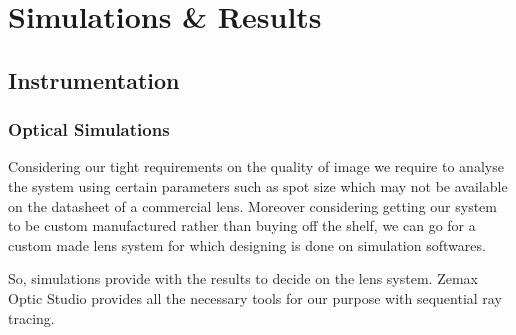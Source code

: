 \documentclass[../../main.tex]{subfiles}
\begin{document}
\chapter{Simulations \& Results}
\thispagestyle{fancy}




\section{Instrumentation}
\subsection{Optical Simulations}
Considering our tight requirements on the quality of image we require to analyse the system using certain parameters such as spot size which may not be available on the datasheet of a commercial lens.
Moreover considering getting our system to be custom manufactured rather than buying off the shelf, we can go for a custom made lens system for which designing is done on simulation softwares.

So, simulations provide with the results to decide on the lens system.
Zemax Optic Studio provides all the necessary tools for our purpose with sequential ray tracing.
\end{document}
